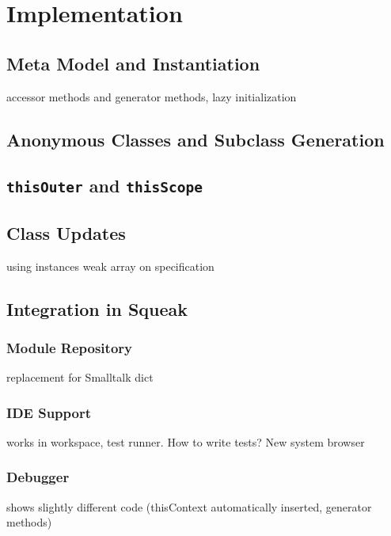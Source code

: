 \chapter{Implementation}

\section{Meta Model and Instantiation}
accessor methods and generator methods, lazy initialization

\section{Anonymous Classes and Subclass Generation}

\section{\texttt{thisOuter} and \texttt{thisScope}}

\section{Class Updates}
using instances weak array on specification

\section{Integration in Squeak}

\subsection{Module Repository}
replacement for Smalltalk dict

\subsection{IDE Support}
works in workspace, test runner. How to write tests? New system browser

\subsection{Debugger}
shows slightly different code (thisContext automatically inserted, generator methods)